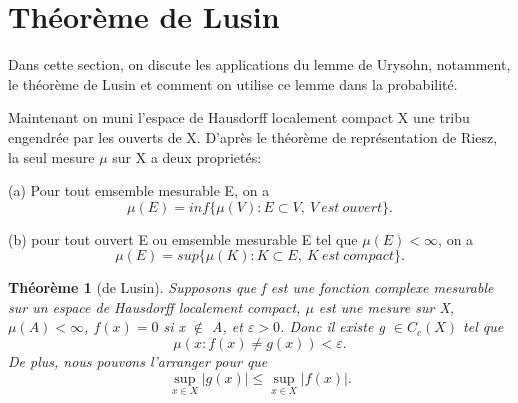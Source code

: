 \documentclass{article}
\newtheorem{theorem}{Théorème}[section]
\begin{document}
\section{Théorème de Lusin}
Dans cette section, on discute les applications du lemme de Urysohn, notamment, le théorème de Lusin et comment on utilise ce lemme dans la probabilité. \par

Maintenant on muni l'espace de Hausdorff localement compact X une tribu engendrée par les ouverts de X. D'après le théorème de représentation de Riesz, la seul mesure $\mu$ sur X a deux proprietés:\par

(a) Pour tout emsemble mesurable E, on a 
\[\mu(E) = inf \{ \mu(V): E \subset V, \ V\ est\ ouvert \}.\]

(b) pour tout ouvert E ou emsemble mesurable E tel que $\mu(E) < \infty$, on a 
\[\mu(E) = sup \{ \mu(K): K \subset E, \ K\ est \ compact \}.\]


\begin{theorem}[de Lusin]
    Supposons que f est une fonction complexe mesurable sur un espace de Hausdorff localement compact, $\mu$ est une mesure sur X, $\mu (A) < \infty$, $f(x) = 0$ si x $\notin$ A, et $\varepsilon >0$. Donc il existe g $\in C_{c}(X)$ tel que 
    \begin{equation}
        \mu ({x: f(x) \neq g(x)}) < \varepsilon .  
    \end{equation}
    De plus, nous pouvons l'arranger pour que 
    \begin{equation}
    \sup_{x\in X} |g(x)| \leq \sup_{x\in X} |f(x)|.
    \end{equation}

\end{theorem}
\end{document}
